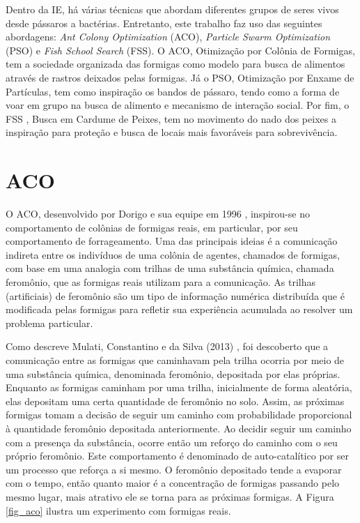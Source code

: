 Dentro da IE, há várias técnicas que abordam diferentes grupos de seres vivos desde pássaros a bactérias. Entretanto, este trabalho faz uso das seguintes abordagens: \textit{ Ant Colony Optimization} (ACO), \textit{Particle Swarm Optimization} (PSO) e \textit{Fish School Search} (FSS). O ACO, Otimização por Colônia de Formigas, tem a sociedade organizada das formigas como modelo para busca de alimentos através de rastros deixados pelas formigas. Já o PSO, Otimização por Enxame de Partículas, tem como inspiração os bandos de pássaro, tendo como a forma de voar em grupo na busca de alimento e mecanismo de interação social. Por fim, o FSS \cite{bastos2009fish}, Busca em Cardume de Peixes, tem no movimento do nado dos peixes a inspiração para proteção e busca de locais mais favoráveis para sobrevivência.

\section{ACO}
\label{sec-aco}

O ACO, desenvolvido por Dorigo e sua equipe em 1996 \cite{dorigo1996any}, inspirou-se no comportamento de colônias de formigas reais, em particular, por seu comportamento de forrageamento. Uma das principais ideias é a comunicação indireta entre os indivíduos de uma colônia de agentes, chamados de formigas, com base em uma analogia com trilhas de uma substância química, chamada feromônio, que as formigas reais utilizam para a comunicação. As trilhas (artificiais) de feromônio são um tipo de informação numérica distribuída que é modificada pelas formigas para refletir sua experiência acumulada ao resolver um problema particular.

Como descreve Mulati, Constantino e da Silva (2013) \cite{mulati2013otimizaccao}, foi descoberto que a comunicação entre as formigas que caminhavam pela trilha ocorria por meio de uma substância química, denominada feromônio, depositada por elas próprias. Enquanto as formigas caminham por uma trilha, inicialmente de forma aleatória, elas depositam uma certa quantidade de feromônio no solo. Assim, as próximas formigas tomam a decisão de seguir um caminho com probabilidade proporcional à quantidade feromônio depositada anteriormente. Ao decidir seguir um caminho com a presença da substância, ocorre então um reforço do caminho com o seu próprio feromônio. Este comportamento é denominado de auto-catalítico por ser um processo que reforça a si mesmo. O feromônio depositado tende a evaporar com o tempo, então quanto maior é a concentração de formigas passando pelo mesmo lugar, mais atrativo ele se torna para as próximas formigas. A Figura \ref{fig_aco} ilustra um experimento com formigas reais.

